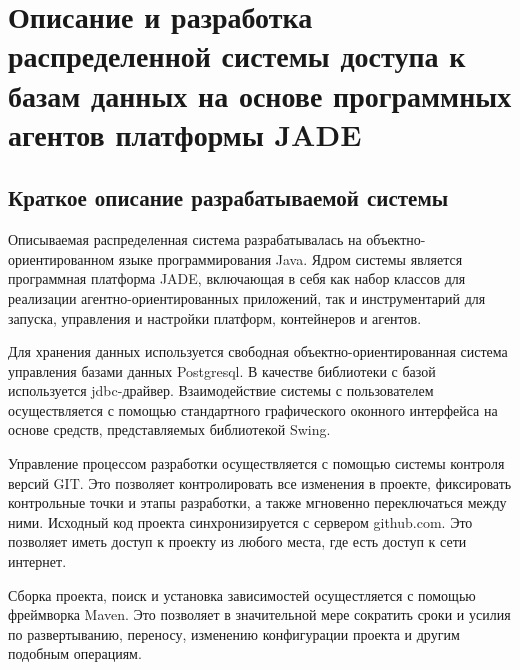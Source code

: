 \section{Описание и разработка распределенной системы доступа к базам данных на основе программных агентов платформы JADE}
\subsection{Краткое описание разрабатываемой системы}
Описываемая распределенная система разрабатывалась на объектно-ориентированном языке программирования Java. Ядром системы является программная платформа JADE, включающая в себя как набор классов для реализации агентно-ориентированных приложений, так и инструментарий для запуска, управления и настройки платформ, контейнеров и агентов.

	Для хранения данных используется свободная объектно-ориентированная система управления базами данных Postgresql. В качестве библиотеки с базой используется jdbc-драйвер. Взаимодействие системы с пользователем осуществляется с помощью стандартного графического оконного интерфейса на основе средств, представляемых библиотекой Swing.

	Управление процессом разработки осуществляется с помощью системы контроля версий GIT. Это позволяет контролировать все изменения в проекте, фиксировать контрольные точки и этапы разработки, а также мгновенно переключаться между ними. Исходный код проекта синхронизируется с сервером github.com. Это позволяет иметь доступ к проекту из любого места, где есть доступ к сети интернет.

	Сборка проекта, поиск и установка зависимостей осущестляется с помощью фреймворка Maven. Это позволяет в значительной мере сократить сроки и усилия по развертыванию, переносу, изменению конфигурации проекта и другим подобным операциям.

